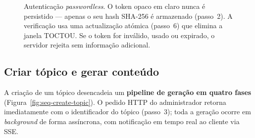 \begin{figure}[H]
	\caption[Sequ\^encia de autentica\c{c}\~ao por \emph{magic link}]{Autentica\c{c}\~ao \emph{passwordless}. O token opaco em claro nunca \'e persistido --- apenas o seu hash SHA-256 \'e armazenado (passo~2). A verifica\c{c}\~ao usa uma actualiza\c{c}\~ao at\'omica (passo~6) que elimina a janela TOCTOU. Se o token for inv\'alido, usado ou expirado, o servidor rejeita sem informa\c{c}\~ao adicional.}
	\label{fig:seq-auth}
\end{figure}

\subsection{Criar t\'opico e gerar conte\'udo}
\label{ssec:seq-create-topic}

A cria\c{c}\~ao de um t\'opico desencadeia um \textbf{pipeline de gera\c{c}\~ao
em quatro fases} (Figura~\ref{fig:seq-create-topic}). O pedido HTTP do
administrador retorna imediatamente com o identificador do t\'opico (passo~3);
toda a gera\c{c}\~ao ocorre em \emph{background} de forma ass\'incrona, com
notifica\c{c}\~ao em tempo real ao cliente via SSE.

